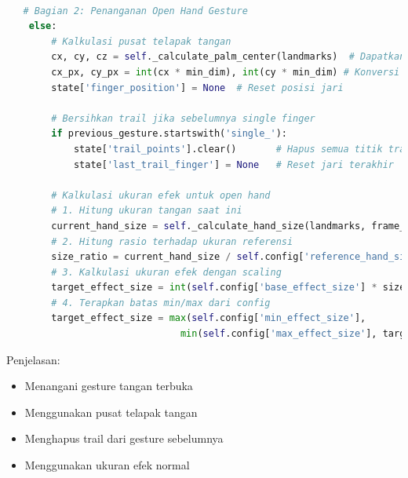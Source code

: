 \documentclass[11pt,a4paper]{article}
\begin{document}
    \begin{lstlisting}[language=Python, caption=Open Hand Gesture]
        
   # Bagian 2: Penanganan Open Hand Gesture
    else:
        # Kalkulasi pusat telapak tangan
        cx, cy, cz = self._calculate_palm_center(landmarks)  # Dapatkan koordinat center
        cx_px, cy_px = int(cx * min_dim), int(cy * min_dim) # Konversi ke pixel
        state['finger_position'] = None  # Reset posisi jari
        
        # Bersihkan trail jika sebelumnya single finger
        if previous_gesture.startswith('single_'):
            state['trail_points'].clear()       # Hapus semua titik trail
            state['last_trail_finger'] = None   # Reset jari terakhir
        
        # Kalkulasi ukuran efek untuk open hand
        # 1. Hitung ukuran tangan saat ini
        current_hand_size = self._calculate_hand_size(landmarks, frame_dims)
        # 2. Hitung rasio terhadap ukuran referensi
        size_ratio = current_hand_size / self.config['reference_hand_size']
        # 3. Kalkulasi ukuran efek dengan scaling
        target_effect_size = int(self.config['base_effect_size'] * size_ratio * self.config['hand_size_scale'])
        # 4. Terapkan batas min/max dari config
        target_effect_size = max(self.config['min_effect_size'],
                               min(self.config['max_effect_size'], target_effect_size))
    \end{lstlisting}
    Penjelasan: 
    \begin{itemize}
        \item Menangani gesture tangan terbuka
        \item Menggunakan pusat telapak tangan
        \item Menghapus trail dari gesture sebelumnya
        \item Menggunakan ukuran efek normal
    \end{itemize}
\end{document}

